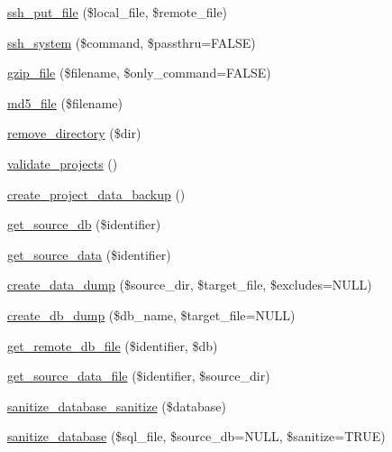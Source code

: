 \begin{DoxyCompactItemize}
\hyperlink{class_sldeploy_ad13a7b10365361da78af141bec5f5bbf}{ssh\_\-put\_\-file} (\$local\_\-file, \$remote\_\-file)
\item 
\hyperlink{class_sldeploy_ad5d0153681d636227aac630f1c32629f}{ssh\_\-system} (\$command, \$passthru=FALSE)
\item 
\hyperlink{class_sldeploy_a922035a7c68551ad5d34fb7144b067dc}{gzip\_\-file} (\$filename, \$only\_\-command=FALSE)
\item 
\hyperlink{class_sldeploy_a9ac401887df6b6d3f118fa1af8c987b5}{md5\_\-file} (\$filename)
\item 
\hyperlink{class_sldeploy_abd3212048b835599fef4a37f2125eb6c}{remove\_\-directory} (\$dir)
\item 
\hyperlink{class_sldeploy_a279f8f924b7fd3d7db68b0a7a2d0aba1}{validate\_\-projects} ()
\item 
\hyperlink{class_sldeploy_aa1e5d1ffc4ded770bea1de400df24ec5}{create\_\-project\_\-data\_\-backup} ()
\item 
\hyperlink{class_sldeploy_ac140d8c2f59866e282ac00360d897b2b}{get\_\-source\_\-db} (\$identifier)
\item 
\hyperlink{class_sldeploy_ac6ff35c515c37878eab4478c783db6f9}{get\_\-source\_\-data} (\$identifier)
\item 
\hyperlink{class_sldeploy_a3b7be4fb4a21ce685eba5cb19256e288}{create\_\-data\_\-dump} (\$source\_\-dir, \$target\_\-file, \$excludes=NULL)
\item 
\hyperlink{class_sldeploy_afec1390b8a27d38293cdfab28764cf05}{create\_\-db\_\-dump} (\$db\_\-name, \$target\_\-file=NULL)
\item 
\hyperlink{class_sldeploy_a36bcdb4527d4cfd29820243c4855f3dd}{get\_\-remote\_\-db\_\-file} (\$identifier, \$db)
\item 
\hyperlink{class_sldeploy_a64454a6b24f9442a9bc7be51b9ab666d}{get\_\-source\_\-data\_\-file} (\$identifier, \$source\_\-dir)
\item 
\hyperlink{class_sldeploy_a046789750c550ebe7371985782ff2ebb}{sanitize\_\-database\_\-sanitize} (\$database)
\item 
\hyperlink{class_sldeploy_a7630a30023f845a4ade82d2b93d5c7d9}{sanitize\_\-database} (\$sql\_\-file, \$source\_\-db=NULL, \$sanitize=TRUE)
\end{DoxyCompactItemize}
